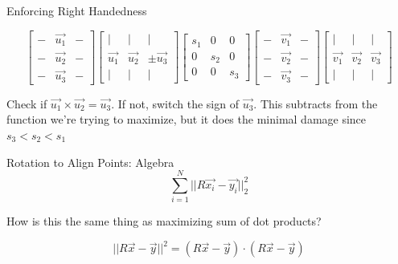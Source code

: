 \documentclass{beamer}
\begin{document}
\begin{frame}{Enforcing Right Handedness}


\[ \left[ \begin{array}{ccc} - & \vec{u_1} & - \\ - & \vec{u_2} & - \\ - & \vec{u_3} & - \end{array} \right] \left[ \begin{array}{ccc} | & | & | \\ \vec{u_1} & \vec{u_2} & \pm \vec{u_3} \\ | & | & | \end{array} \right]  \left[ \begin{array}{ccc} s_1 & 0 & 0 \\ 0 & s_2 & 0 \\ 0 & 0 & s_3 \end{array} \right] \left[ \begin{array}{ccc} - & \vec{v_1} & - \\ - & \vec{v_2} & - \\ - & \vec{v_3} & - \end{array} \right] \left[ \begin{array}{ccc} | & | & | \\ \vec{v_1} & \vec{v_2} & \vec{v_3} \\ | & | & | \end{array} \right] \]


\small
Check if $\vec{u_1} \times \vec{u_2} = \vec{u_3}$.  If not, switch the sign of $\vec{u_3}$.  This subtracts from the function we're trying to maximize, but it does the minimal damage since $s_3 < s_2 < s_1$

\end{frame}


\begin{frame}{Rotation to Align Points: Algebra}
\[ \sum_{i=1}^N ||R\vec{x_i} - \vec{y_i}||_2^2 \]

How is this the same thing as maximizing sum of dot products?

\[ ||R\vec{x} - \vec{y}||^2 = (R\vec{x} - \vec{y}) \cdot (R\vec{x} - \vec{y}) \]




\end{frame}
\end{document}
